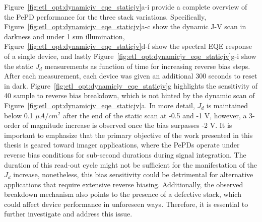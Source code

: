 Figure~\ref{fig:etl_opt:dynamicjv_eqe_staticjv}a-i provide a complete overview of the PePD performance for the three stack variations. Specifically, Figure~\ref{fig:etl_opt:dynamicjv_eqe_staticjv}a-c show the dynamic J-V scan in darkness and under 1 sun illumination, Figure~\ref{fig:etl_opt:dynamicjv_eqe_staticjv}d-f show the spectral EQE response of a single device, and lastly Figure~\ref{fig:etl_opt:dynamicjv_eqe_staticjv}g-i show the static $J_d$ measurements as function of time for increasing reverse bias steps. After each measurement, each device was given an additional 300 seconds to reset in dark. Figure~\ref{fig:etl_opt:dynamicjv_eqe_staticjv}g highlights the sensitivity of 40 sample to reverse bias breakdown, which is not hinted by the dynamic scan of Figure~\ref{fig:etl_opt:dynamicjv_eqe_staticjv}a. In more detail, $J_d$ is maintained below 0.1 $\mu A/cm^2$ after the end of the static scan at -0.5 and -1 V, however, a 3-order of magnitude increase is observed once the bias surpasses -2 V. It is important to emphasize that the primary objective of the work presented in this thesis is geared toward imager applications, where the PePDs operate under reverse bias conditions for sub-second durations during signal integration. The duration of this read-out cycle might not be sufficient for the manifestation of the $J_d$ increase, nonetheless, this bias sensitivity could be detrimental for alternative applications that require extensive reverse biasing. Additionally, the observed breakdown mechanism also points to the presence of a defective stack, which could affect device performance in unforeseen ways. Therefore, it is essential to further investigate and address this issue.

